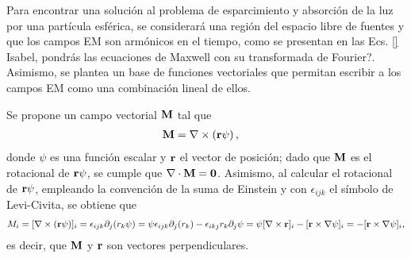 Para encontrar una solución al problema de esparcimiento y absorción de la luz por una partícula esférica, se considerará una región del espacio libre de fuentes y que los campos EM son armónicos en el tiempo, como se presentan en las Ecs. \eqref{} {\color{red} Isabel, pondrás las ecuaciones de Maxwell con su transformada de Fourier?}. Asimismo, se plantea un base de funciones vectoriales que permitan escribir a los campos EM como una combinación lineal de ellos.

Se propone un campo vectorial $\vb{M}$ tal que \cite{bohren1998absorption}
	\begin{align}
	\vb{M} &= \nabla \times \left(\vb{r} \psi\right),
	\label{eq:MrotCPsi}
	\end{align}
donde $\psi$ es una función escalar y $\vb{r}$ el vector de posición; dado que $\vb{M}$ es el rotacional de  $\vb{r}\psi$, se cumple que $\nabla\cdot \vb{M} = \vb{0}$. Asimismo, al calcular el rotacional de $\vb{r}\psi$, empleando la convención de la suma de Einstein y con $\epsilon_{ijk}$ el símbolo de  Levi-Civita, se obtiene que 
	\begin{align}
	M_i = [\nabla\times(\vb{r}\psi)]_i =  \epsilon_{ijk}\partial_j(r_k\psi) =\psi\epsilon_{ijk}\partial_j(r_k) -\epsilon_{ikj}r_k\partial_j\psi  =\psi[\nabla\times\vb{r}]_i - [\vb{r}\times\nabla\psi]_i = - [\vb{r}\times\nabla\psi]_i,
	\end{align}
es decir, que $\vb{M}$ y $\vb{r}$ son vectores perpendiculares.
 
